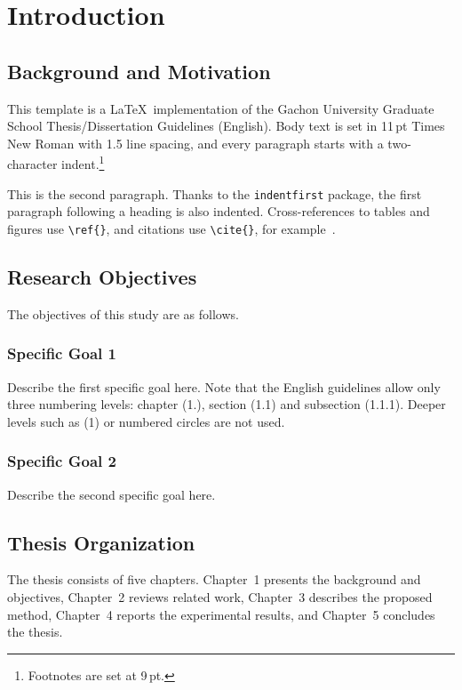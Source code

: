 \chapter{Introduction}
\label{ch:introduction}

\section{Background and Motivation}

This template is a \LaTeX\ implementation of the Gachon University Graduate
School Thesis/Dissertation Guidelines (English). Body text is set in 11\,pt
Times New Roman with 1.5 line spacing, and every paragraph starts with a
two-character indent.\footnote{Footnotes are set at 9\,pt.}

This is the second paragraph. Thanks to the \texttt{indentfirst} package, the
first paragraph following a heading is also indented. Cross-references to
tables and figures use \verb|\ref{}|, and citations use \verb|\cite{}|, for
example~\cite{sample2026}.

\section{Research Objectives}

The objectives of this study are as follows.

\subsection{Specific Goal 1}

Describe the first specific goal here. Note that the English guidelines allow
only three numbering levels: chapter (1.), section (1.1) and subsection
(1.1.1). Deeper levels such as (1) or numbered circles are not used.

\subsection{Specific Goal 2}

Describe the second specific goal here.

\section{Thesis Organization}

The thesis consists of five chapters. Chapter~1 presents the background and
objectives, Chapter~2 reviews related work, Chapter~3 describes the proposed
method, Chapter~4 reports the experimental results, and Chapter~5 concludes
the thesis.
